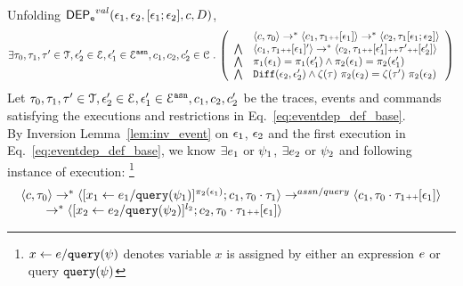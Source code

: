 \begin{subproof}
\label{pf:alg_correct_base}
\\
Unfolding $\mathsf{DEP_{\mathtt{e}}}^{val}(\mathtt{\epsilon}_1, \mathtt{\epsilon}_2, [\mathtt{\epsilon}_1; \mathtt{\epsilon}_2], c, D)$, 
\begin{equation}
\label{eq:eventdep_def_base}
\exists \vtrace_0,
\vtrace_1, \vtrace' \in \mathcal{T}, \event_2' \in \eventset, \event_1' \in \eventset^{\asn}, {c}_1, {c}_2,  {c}_2' \in \cdom \st
  \left(
  \begin{array}{ll}   
 & \config{{c}, \vtrace_0} \rightarrow^{*} 
\config{{c}_1, \vtrace_1 \tracecat [\event_1]}  \rightarrow^{*} 
  \config{{c}_2,  \vtrace_1 [\event_1; \event_2] } 
 \\ 
 \bigwedge &
  \config{{c}_1, \vtrace_1 \tracecat [\event_1]'}  \rightarrow^{*} 
  \config{{c}_2,  \vtrace_1 \tracecat [\event_1']\tracecat \vtrace' \tracecat [\event_2'] } 
\\
\bigwedge &  \pi_1(\event_1) = \pi_1(\event_1') \land \pi_2(\event_1) = \pi_2(\event_1') 
\\
\bigwedge & 
\diff(\event_2,\event_2' ) \land 
\vcounter(\vtrace) ~ \pi_2(\event_2)
= 
\vcounter(\vtrace') ~ \pi_2(\event_2)\\
\end{array}
\right)
\end{equation}
%
Let $\mathtt{\tau}_0,
\mathtt{\tau}_1, \mathtt{\tau}' \in \mathcal{T}, \mathtt{\epsilon}_2' \in \mathcal{E}, \mathtt{\epsilon}_1' \in \mathcal{E}^{\mathtt{{asn}}}, {c}_1, {c}_2,  {c}_2'$ be the traces, events and commands satisfying the executions and restrictions in Eq.~\ref{eq:eventdep_def_base}.
\\
By Inversion Lemma~\ref{lem:inv_event} on 
 $\mathtt{\epsilon}_1$, $\mathtt{\epsilon}_2$ and the first execution in Eq.~\ref{eq:eventdep_def_base},
 we know $\exists e_1$ or $\psi_1$, $\exists e_2$ or $\psi_2$ and following instance of execution:
%
\footnote{
$\mathrel{ x \leftarrow e / {\tt query}(\psi) }$ denotes variable $x$ is assigned by either an expression $e$ or query ${\tt query}(\psi)$
}
\begin{equation}
\label{eq:valdep_inv1}
  \begin{array}{l}   
\langle {c}, \mathtt{\tau}_0 \rangle \rightarrow^{*} 
\langle [\mathrel{ x_1 \leftarrow e_1 / {\tt query}(\psi_1) }]^{\pi_2(\mathtt{\epsilon}_1)} ; {c}_1, \mathtt{\tau}_0 \cdot \mathtt{\tau}_1 \rangle  
\rightarrow^{assn/query}
 \langle c_1, \mathtt{\tau}_0 \cdot \mathtt{\tau}_1 {\scriptscriptstyle ++} [\mathtt{\epsilon}_1] \rangle \\
  \qquad \rightarrow^{*} 
  \langle [\mathrel{ {x}_2 \leftarrow e_2 / {\tt query}(\psi_2) }]^{l_2};{c}_2, 
  \mathtt{\tau}_0 \cdot \mathtt{\tau}_1 {\scriptscriptstyle ++} [\mathtt{\epsilon}_1] \rangle 

\end{array}
\end{equation}
\end{subproof}
